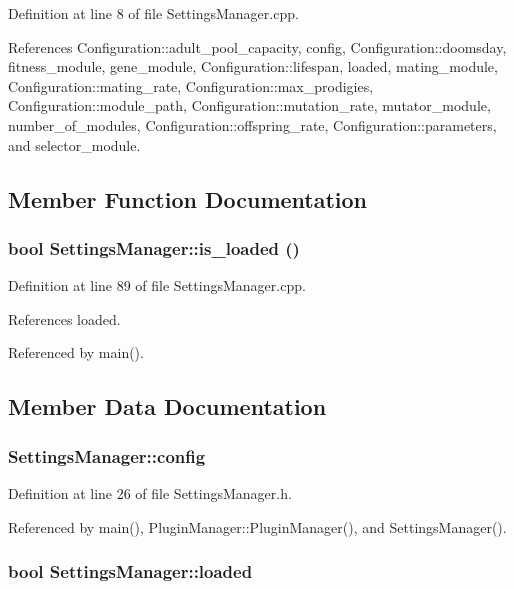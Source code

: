 Definition at line 8 of file SettingsManager.cpp.

References Configuration::adult\_\-pool\_\-capacity, config, Configuration::doomsday, fitness\_\-module, gene\_\-module, Configuration::lifespan, loaded, mating\_\-module, Configuration::mating\_\-rate, Configuration::max\_\-prodigies, Configuration::module\_\-path, Configuration::mutation\_\-rate, mutator\_\-module, number\_\-of\_\-modules, Configuration::offspring\_\-rate, Configuration::parameters, and selector\_\-module.

\subsection{Member Function Documentation}
\hypertarget{classSettingsManager_16e36a836f6e630c63edd28dfc4e61f7}{
\subsubsection{\setlength{\rightskip}{0pt plus 5cm}bool SettingsManager::is\_\-loaded ()}}
\label{classSettingsManager_16e36a836f6e630c63edd28dfc4e61f7}




Definition at line 89 of file SettingsManager.cpp.

References loaded.

Referenced by main().

\subsection{Member Data Documentation}
\hypertarget{classSettingsManager_99a9134ef5eecd398af9e2e1cb215ee4}{
\subsubsection{ {\bf SettingsManager::config}}}
\label{classSettingsManager_99a9134ef5eecd398af9e2e1cb215ee4}




Definition at line 26 of file SettingsManager.h.

Referenced by main(), PluginManager::PluginManager(), and SettingsManager().\hypertarget{classSettingsManager_0b2873bd736197002cfefefb152519ec}{
\subsubsection{\setlength{\rightskip}{0pt plus 5cm}bool {\bf SettingsManager::loaded}}}
\label{classSettingsManager_0b2873bd736197002cfefefb152519ec}




